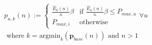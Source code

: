 \begin{equation}
\begin{split}
	p_{u,k}(n) :=
	\begin{cases}
		\frac{\hat{E}_u(n)}{\kappa}\beta &\text{if } \frac{\hat{E}_u(n)}{\kappa}\beta \leq P_{max,u}\\
		P_{max,i} &\text{otherwise}
 	\end{cases}
 	\forall u  \\\text{ where } k = \text{argmin}_k(\textbf{p}_{base}(n)) \text{ and } n > 1
\end{split}
\label{ch3:equ:valley-filling-equation}
\end{equation}